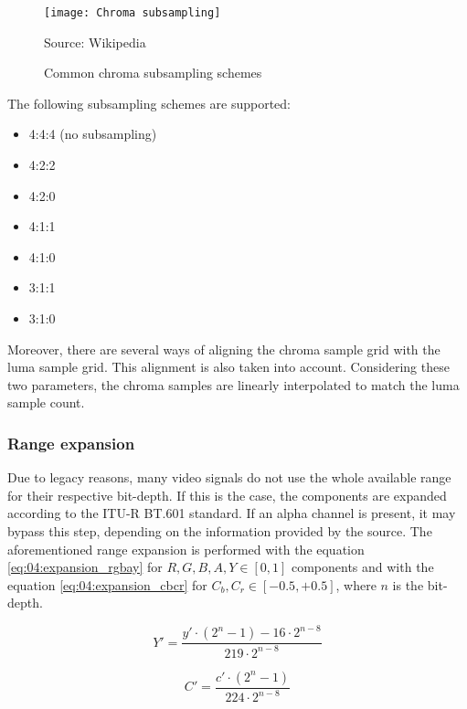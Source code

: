 \documentclass[../main.tex]{subfiles}
\begin{document}
\begin{figure}[htbp]
    \centering
    \texttt{[image: Chroma subsampling]}

    Source: Wikipedia
    \caption{Common chroma subsampling schemes}
    \label{fig:04:chroma_subsampling}
\end{figure}

The following subsampling schemes are supported:

\begin{itemize}
    \item 4:4:4 (no subsampling)
    \item 4:2:2
    \item 4:2:0
    \item 4:1:1
    \item 4:1:0
    \item 3:1:1
    \item 3:1:0
\end{itemize}

Moreover, there are several ways of aligning the chroma sample grid with the luma sample grid. This alignment is also taken into account. Considering these two parameters, the chroma samples are linearly interpolated to match the luma sample count.


\subsubsection{Range expansion}

Due to legacy reasons, many video signals do not use the whole available range for their respective bit-depth. If this is the case, the components are expanded according to the ITU-R BT.601 standard\cite{bt601}. If an alpha channel is present, it may bypass this step, depending on the information provided by the source. The aforementioned range expansion is performed with the equation \eqref{eq:04:expansion_rgbay} for $R, G, B, A, Y \in [0, 1]$ components and with the equation \eqref{eq:04:expansion_cbcr} for $C_b, C_r \in [-0.5, +0.5]$, where $n$ is the bit-depth.\newline

\begin{equation}\label{eq:04:expansion_rgbay}
    Y' = \frac{y' \cdot (2^n - 1) - 16\cdot2^{n-8}}{219 \cdot 2^{n-8}}
\end{equation}

\begin{equation}\label{eq:04:expansion_cbcr}
    C' = \frac{c' \cdot (2^n - 1)}{224 \cdot 2^{n-8}}
\end{equation}
\end{document}
